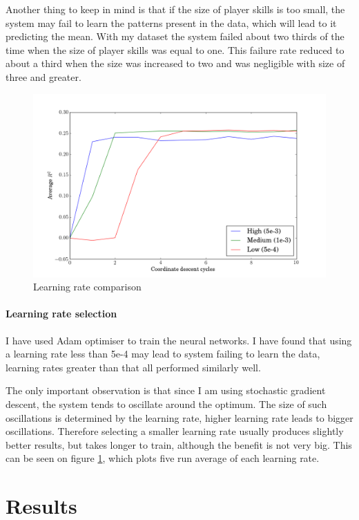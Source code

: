 \documentclass[12pt,a4paper]{book}
\begin{document}
Another thing to keep in mind is that if the size of player skills is too small, the system may fail to learn the patterns present in the data, which will lead to it predicting the mean.
With my dataset the system failed about two thirds of the time when the size of player skills was equal to one.
This failure rate reduced to about a third when the size was increased to two and was negligible with size of three and greater.

\begin{figure}[ht]
\centering
\includegraphics[scale=0.5]{learning-rate}
\caption{Learning rate comparison}
\label{fig:learning-rate}
\end{figure}
\paragraph{Learning rate selection}
I have used Adam optimiser to train the neural networks.
I have found that using a learning rate less than 5e-4 may lead to system failing to learn the data, learning rates greater than that all performed similarly well.

The only important observation is that since I am using stochastic gradient descent, the system tends to oscillate around the optimum.
The size of such oscillations is determined by the learning rate, higher learning rate leads to bigger oscillations.
Therefore selecting a smaller learning rate usually produces slightly better results, but takes longer to train, although the benefit is not very big.
This can be seen on figure \ref{fig:learning-rate}, which plots five run average of each learning rate.


\section{Results}
\end{document}
